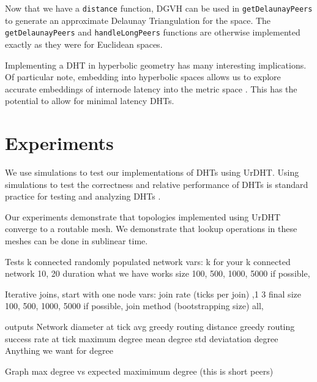 \documentclass[11pt,conference]{IEEEtran}
\begin{document}
Now that we have a \texttt{distance} function, DGVH can be used in \texttt{getDelaunayPeers} to generate an approximate Delaunay Triangulation for the space.
The \texttt{getDelaunayPeers} and \texttt{handleLongPeers} functions are otherwise implemented exactly as they were for Euclidean spaces. 




Implementing a DHT in hyperbolic geometry has many interesting implications.
Of particular note, embedding into hyperbolic spaces allows us to explore accurate embeddings of internode latency into the metric space \cite{kleinberg2007geographic} \cite{cvetkovski2009hyperbolic}.
This has the potential to allow for minimal latency DHTs.


%
%
%	
\section{Experiments}
\label{sec:experiments}

We use simulations to test our implementations of DHTs using UrDHT.
Using simulations to test the correctness and relative performance of DHTs is standard practice for testing and analyzing DHTs \cite{kademlia} \cite{chord} \cite{tapestry} \cite{symphony} \cite{raynet} \cite{li2005comparing}.

Our experiments demonstrate that topologies implemented using UrDHT converge to a routable mesh.
We demonstrate that lookup operations in these meshes can be done in sublinear time.

Tests
k connected randomly populated network
vars:
k for your k connected network 10, 20
duration what we have works
size 100, 500, 1000, 5000 if possible,

Iterative joins, start with one node
vars:  join rate (ticks per join) ,1 3 
final size  100, 500, 1000, 5000 if possible,
join method (bootstrapping size)  all,

outputs
Network diameter at tick
avg greedy routing distance
greedy routing success rate at tick
maximum degree
mean degree
std deviatation degree
Anything we want for degree


Graph max degree vs expected  maximimum degree  (this is short peers)
\end{document}
